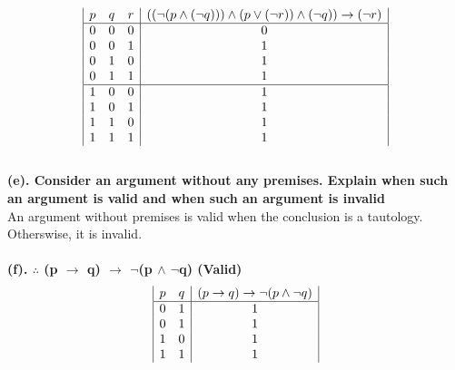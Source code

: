 \documentclass[a4paper]{article}
\begin{document}
\begin{displaymath}
    \begin{array}{|c c c|c|}
        p & q & r & ((\neg (p \wedge (\neg q))) \wedge (p \vee (\neg r)) \wedge (\neg q)) \rightarrow (\neg r) \\
        \hline
        0 & 0 & 0 & 0                                                                                          \\
        0 & 0 & 1 & 1                                                                                          \\
        0 & 1 & 0 & 1                                                                                          \\
        0 & 1 & 1 & 1                                                                                          \\
        \hline
        1 & 0 & 0 & 1                                                                                          \\
        1 & 0 & 1 & 1                                                                                          \\
        1 & 1 & 0 & 1                                                                                          \\
        1 & 1 & 1 & 1                                                                                          \\
    \end{array}
\end{displaymath}
\ \\
\textbf{(e). Consider an argument without any premises. Explain when such an argument is valid and when such an argument is invalid}\\
An argument without premises is valid when the conclusion is a tautology. Otherswise, it is invalid.
\\\\
\textbf{(f). $\therefore $ (p $\rightarrow $ q) $\rightarrow $ $\neg $(p $\wedge $ $\neg $q) (Valid)}\\
\begin{displaymath}
    \begin{array}{|c c|c|}
        p & q & (p \rightarrow q) \rightarrow \neg (p \wedge \neg q) \\
        \hline
        0 & 1 & 1                                                    \\
        0 & 1 & 1                                                    \\
        1 & 0 & 1                                                    \\
        1 & 1 & 1                                                    \\
    \end{array}
\end{displaymath}
\end{document}
